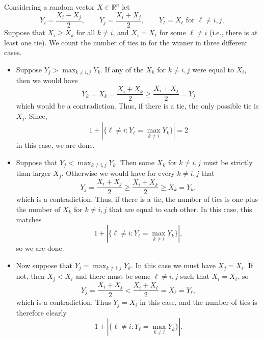 \documentclass{article}
\newcommand{\R}{\mathbb{R}}
\begin{document}
\begin{appendix}
Considering a random vector $X \in \R^n$ let 
\begin{equation}
    Y_i = \frac{X_i - X_j}{2}, \qquad  Y_j = \frac{X_i + X_j}{2}, \qquad  Y_{\ell} = X_{\ell} \text{ for } \ell \neq i, j,
\end{equation}
Suppose that $X_i \geq X_k$ for all $k \neq i$, and $X_i = X_{\ell}$ for some $\ell \neq i$ (i.e., there is at least one tie). We count the number of ties in for the winner in three different cases.

\begin{itemize}
    \item Suppose $Y_j > \max_{k \neq i, j} Y_k$. If any of the $X_k$ for $k \neq i, j$ were equal to $X_i$, then we would have 
    \begin{equation*}
       Y_k = X_k =  \frac{X_i + X_k }{2} \geq \frac{X_i + X_j}{2} = Y_j
    \end{equation*}
    which would be a contradiction. Thus, if there is a tie, the only possible tie is $X_j$. Since, 
    \begin{equation*}
        1 + |\{ \ell \neq i : Y_{\ell} = \max_{k \neq i} Y_k  \}| = 2
    \end{equation*}
    in this case, we are done. 
    \item Suppose that $Y_j < \max_{k \neq i, j} Y_k$. Then some $X_k$ for $k \neq i, j$ must be strictly than larger $X_j$. Otherwise we would have for every $k \neq i, j$ that  
    \begin{equation*}
        Y_j = \frac{X_i + X_j}{2} \geq  \frac{X_i + X_k}{2} \geq X_k = Y_k,
    \end{equation*}
     which is a contradiction. Thus, if there is a tie, the number of ties is one plus the number of $X_k$ for $k \neq i, j$ that are equal to each other. In this case, this matches
    \begin{equation*}
        1 + |\{ \ell \neq i : Y_{\ell} = \max_{k \neq i} Y_k  \}|,
    \end{equation*}
    so we are done.
    \item Now suppose that $Y_j = \max_{k \neq i, j} Y_k$. In this case we must have $X_j = X_i$. If not, then $X_j < X_i$ and  there must be some $\ell \neq i, j$ such that $X_i = X_{\ell}$, so 
    \begin{equation*}
        Y_j =  \frac{X_i + X_j}{2} < \frac{X_i + X_{\ell}}{2} = X_{\ell} = Y_{\ell},
    \end{equation*}
    which is a contradiction. Thus $Y_j = X_i$ in this case, and the number of ties is therefore clearly 
    \begin{equation*}
        1 + |\{ \ell \neq i : Y_{\ell} = \max_{k \neq i} Y_k  \}|.
    \end{equation*}
\end{itemize}


\end{appendix}
\end{document}
